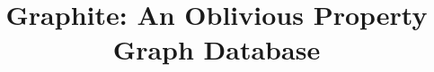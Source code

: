\documentclass[sigconf]{acmart}
\newcommand{\system}{Graphite\xspace}
\begin{document}
\title{\system: An Oblivious Property Graph Database}




\maketitle









%
% 

%



\end{document}
